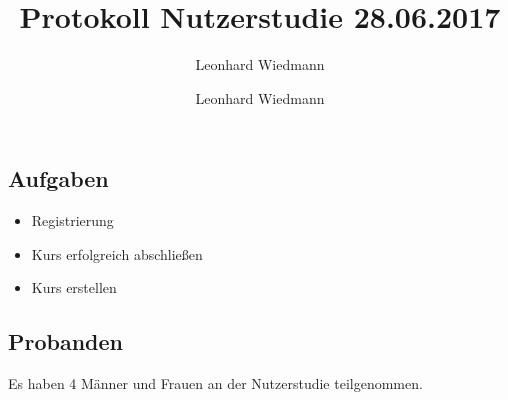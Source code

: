 \documentclass[colorback, accentcolor=tud1c, paper=a4]{tudexercise}
\title{Protokoll Nutzerstudie 28.06.2017}
\subtitle{Leonhard Wiedmann}
\author{Leonhard Wiedmann}
\begin{document}
\maketitle
\subsection*{Aufgaben}
\begin{itemize}
	\item Registrierung
	\item Kurs erfolgreich abschließen
	\item Kurs erstellen
\end{itemize}

\subsection*{Probanden}
Es haben 4 Männer und Frauen an der Nutzerstudie teilgenommen.
\end{document}
